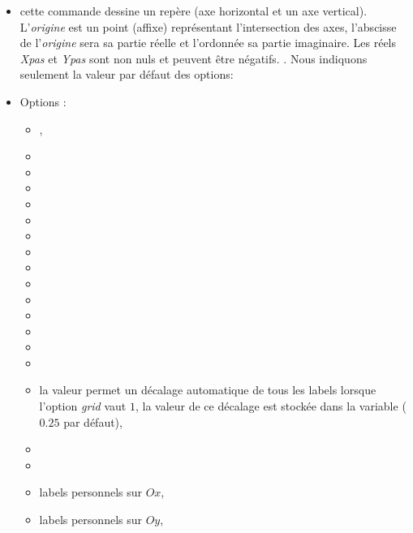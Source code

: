 \begin{itemize}
 \item\desc cette commande dessine un repère (axe horizontal et un axe vertical). L'\emph{origine} est un point (affixe) représentant l'intersection des axes, l'abscisse de l'\emph{origine} sera sa partie réelle et l'ordonnée sa partie imaginaire. Les réels \emph{Xpas} et \emph{Ypas} sont non nuls et peuvent être négatifs. . Nous indiquons seulement la valeur par défaut des options:
 \item Options :
  \begin{itemize}
  \item {},
  \item {} 
  \item {} 
  \item {}
  \item {}
  \item {}
  \item {}
  \item {}
  \item {}
  \item {}
  \item {}
  \item {}
  \item {}
  \item {}
  \item {}
  \item {} la valeur \jump permet un décalage automatique de tous les labels lorsque l'option \emph{grid} vaut $1$, la valeur de ce décalage est stockée dans la variable  ($0.25$ par défaut),
  \item {}
  \item {}
  \item {} labels personnels sur $Ox$,
  \item {} labels personnels sur $Oy$,

\end{itemize}
\end{itemize}

